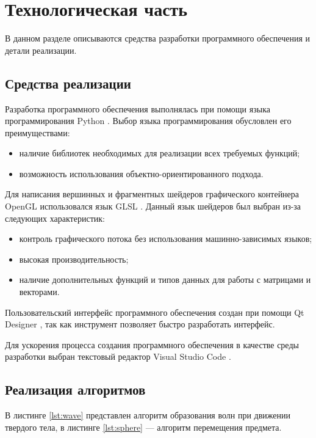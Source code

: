 \chapter{Технологическая часть}

В данном разделе описываются средства разработки программного обеспечения и детали реализации.

\section{Средства реализации}

Разработка программного обеспечения выполнялась при помощи языка программирования Python \cite{python}. Выбор языка программирования обусловлен его преимуществами:

\begin{itemize}
	\item наличие библиотек необходимых для реализации всех требуемых функций;
	\item возможность использования объектно-ориентированного подхода.
\end{itemize}

Для написания вершинных и фрагментных шейдеров графического контейнера OpenGL использовался язык GLSL \cite{glsl}. Данный язык шейдеров был выбран из-за следующих характеристик:

\begin{itemize}
	\item контроль графического потока без использования машинно-зависимых языков;
	\item высокая производительность;
	\item наличие дополнительных функций и типов данных для работы с матрицами и векторами.
\end{itemize}

Пользовательский интерфейс программного обеспечения создан при помощи Qt Designer \cite{qt}, так как инструмент позволяет быстро разработать интерфейс.

Для ускорения процесса создания программного обеспечения в качестве среды разработки выбран текстовый редактор Visual Studio Code \cite{vs}.

\section{Реализация алгоритмов}

В листинге \ref{lst:wave} представлен алгоритм образования волн при движении твердого тела, в листинге \ref{lst:sphere} --- алгоритм перемещения предмета.

